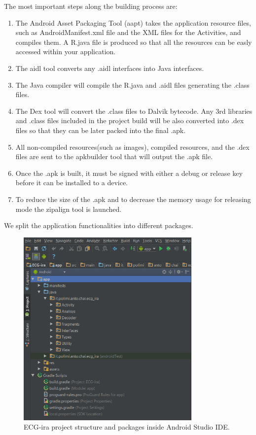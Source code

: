 The most important steps along the building process are:
\begin{enumerate}
	\item The Android Asset Packaging Tool (aapt) takes the application resource files, such as AndroidManifest.xml file and the XML files for the Activities, and compiles them. A R.java  file is produced so that all the resources can be easly accessed within your application.
	\item The aidl tool converts any .aidl interfaces into Java interfaces.
	\item The Java compiler will compile the R.java and .aidl files generating the .class files.
	\item The Dex tool will convert the .class files to Dalvik bytecode. Any 3rd libraries and .class files included in the project build will be also converted into .dex files so that they can be later packed into the final .apk.
	\item All non-compiled resources(such as images), compiled resources, and the .dex files  are sent to the apkbuilder tool that will output the .apk file.
	\item Once the .apk is built, it must be signed with either a debug or release key before it can be installed to a device.
	\item To reduce the size of the .apk and to decrease the memory usage for releasing mode the zipalign tool is launched.
\end{enumerate}
We split the application functionalities into different packages. 
\begin{figure}[ht!]
	\centering
	\includegraphics[width=90mm]{figures/ch8/4.png}
	\caption{ECG-ira project structure and packages inside Android Studio IDE.}
	\label{fig8.4}
\end{figure}
